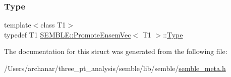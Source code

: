 \subsubsection{\texorpdfstring{Type}{Type}\hspace{0.1cm}{\footnotesize\ttfamily [2/2]}}
{\footnotesize\ttfamily template$<$class T1$>$ \\
typedef T1 \mbox{\hyperlink{structSEMBLE_1_1PromoteEnsemVec}{S\+E\+M\+B\+L\+E\+::\+Promote\+Ensem\+Vec}}$<$ T1 $>$\+::\mbox{\hyperlink{structSEMBLE_1_1PromoteEnsemVec_ab6dfb4c2ea4316822cd32c6cce09c9bd}{Type}}}



The documentation for this struct was generated from the following file\+:\begin{DoxyCompactItemize}
\item 
/\+Users/archanar/three\+\_\+pt\+\_\+analysis/semble/lib/semble/\mbox{\hyperlink{lib_2semble_2semble__meta_8h}{semble\+\_\+meta.\+h}}\end{DoxyCompactItemize}
